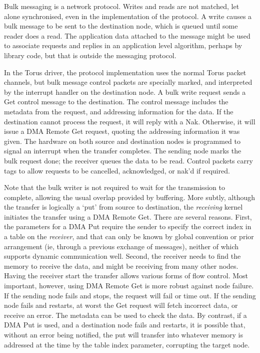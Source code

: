 Bulk messaging is a network protocol. Writes and reads are not
matched, let alone synchronised, even in the implementation of the
protocol. A write causes a bulk message to be sent to the destination
node, which is queued until some reader does a read.  The application
data attached to the message might be used to associate requests and
replies in an application level algorithm, perhaps by library code,
but that is outside the messaging protocol.

In the Torus driver, the protocol implementation uses the normal Torus
packet channels, but bulk message control packets are specially
marked, and interpreted by the interrupt handler on the destination
node. A bulk write request sends a Get control message to the
destination. The control message includes the metadata from the
request, and addressing information for the data. If the destination
cannot process the request, it will reply with a Nak. Otherwise, it
will issue a DMA Remote Get request, quoting the addressing
information it was given. The hardware on both source and destination
nodes is programmed to signal an interrupt when the transfer
completes. The sending node marks the bulk request done; the receiver
queues the data to be read. Control packets carry tags to allow
requests to be cancelled, acknowledged, or nak'd if required.

Note that the bulk writer is not required to wait for the transmission
to complete, allowing the usual overlap provided by buffering.  More
subtly, although the transfer is logically a `put' from source to
destination, the \emph{receiving} kernel initiates the transfer using
a DMA Remote Get.  There are several reasons. First, the parameters
for a DMA Put require the sender to specify the correct index in a
table on the \emph{receiver}, and that can only be known by global
convention or prior arrangement (ie, through a previous exchange of
messages), neither of which supports dynamic communication
well. Second, the receiver needs to find the memory to receive the
data, and might be receiving from many other nodes.  Having the
receiver start the transfer allows various forms of flow control.
Most important, however, using DMA Remote Get is more robust against
node failure.  If the sending node fails and stops, the request will
fail or time out.  If the sending node fails and restarts, at worst
the Get request will fetch incorrect data, or receive an error. The
metadata can be used to check the data.  By contrast, if a DMA Put is
used, and a destination node fails and restarts, it is possible that,
without an error being notified, the put will transfer into whatever
memory is addressed at the time by the table index parameter,
corrupting the target node.

